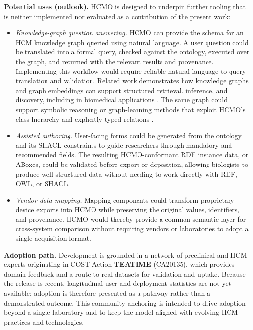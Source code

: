 \textbf{Potential uses (outlook).}
HCMO is designed to underpin further tooling that is neither implemented nor evaluated as a contribution of the present work:
\begin{itemize}
    \item \emph{Knowledge-graph question answering.}
    HCMO can provide the schema for an HCM knowledge graph queried using natural language. A user question could be translated into a formal query, checked against the ontology, executed over the graph, and returned with the relevant results and provenance. Implementing this workflow would require reliable natural-language-to-query translation and validation. Related work demonstrates how knowledge graphs and graph embeddings can support structured retrieval, inference, and discovery, including in biomedical applications \cite{sanou2026,bian2025}. The same graph could support symbolic reasoning or graph-learning methods that exploit HCMO's class hierarchy and explicitly typed relations \cite{butz}.

    \item \emph{Assisted authoring.}
    User-facing forms could be generated from the ontology and its SHACL constraints to guide researchers through mandatory and recommended fields. The resulting HCMO-conformant RDF instance data, or ABoxes, could be validated before export or deposition, allowing biologists to produce well-structured data without needing to work directly with RDF, OWL, or SHACL.

    \item \emph{Vendor-data mapping.}
    Mapping components could transform proprietary device exports into HCMO while preserving the original values, identifiers, and provenance. HCMO would thereby provide a common semantic layer for cross-system comparison without requiring vendors or laboratories to adopt a single acquisition format.

\end{itemize}

\textbf{Adoption path.} Development is grounded in a network of preclinical and HCM experts originating in COST Action \textbf{TEATIME} (CA20135), which provides domain feedback and a route to real datasets for validation and uptake. Because the release is recent, longitudinal user and deployment statistics are not yet available; adoption is therefore presented as a pathway rather than a demonstrated outcome. This community anchoring is intended to drive adoption beyond a single laboratory and to keep the model aligned with evolving HCM practices and technologies.
